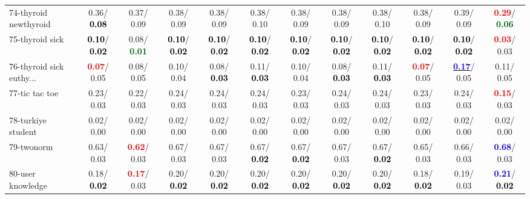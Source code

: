 \begin{table}[h]
\begin{center}
{\begin{tabular}{lc|c|c|c|c|c|c|c|c|c|c}
74-thyroid newthyroid &   0.36/\textcolor{black}{\textbf{  0.08}} &   0.37/  0.09 &   0.38/  0.09 &   0.38/  0.09 &   0.38/  0.10 &   0.38/  0.09 &   0.38/  0.09 &   0.38/  0.10 &   0.38/  0.09 &   0.39/  0.09 & \textcolor{red}{\textbf{  0.29}}/\textcolor{darkgreen}{\textbf{  0.06}} \\
75-thyroid sick & \textcolor{black}{\textbf{  0.10}}/\textcolor{black}{\textbf{  0.02}} &   0.08/\textcolor{darkgreen}{\textbf{  0.01}} & \textcolor{black}{\textbf{  0.10}}/\textcolor{black}{\textbf{  0.02}} & \textcolor{black}{\textbf{  0.10}}/\textcolor{black}{\textbf{  0.02}} & \textcolor{black}{\textbf{  0.10}}/\textcolor{black}{\textbf{  0.02}} & \textcolor{black}{\textbf{  0.10}}/\textcolor{black}{\textbf{  0.02}} & \textcolor{black}{\textbf{  0.10}}/\textcolor{black}{\textbf{  0.02}} & \textcolor{black}{\textbf{  0.10}}/\textcolor{black}{\textbf{  0.02}} & \textcolor{black}{\textbf{  0.10}}/\textcolor{black}{\textbf{  0.02}} & \textcolor{black}{\textbf{  0.10}}/\textcolor{black}{\textbf{  0.02}} & \textcolor{red}{\textbf{  0.03}}/  0.03 \\
76-thyroid sick euthy... & \textcolor{red}{\textbf{  0.07}}/  0.05 &   0.08/  0.05 &   0.10/  0.04 &   0.08/\textcolor{black}{\textbf{  0.03}} &   0.11/\textcolor{black}{\textbf{  0.03}} &   0.10/  0.04 &   0.08/\textcolor{black}{\textbf{  0.03}} &   0.11/\textcolor{black}{\textbf{  0.03}} & \textcolor{red}{\textbf{  0.07}}/  0.05 & \underline{\textcolor{blue}{\textbf{  0.17}}}/  0.05 &   0.11/  0.05 \\
77-tic tac toe &   0.23/  0.03 &   0.22/  0.03 &   0.24/  0.03 &   0.24/  0.03 &   0.24/  0.03 &   0.23/  0.03 &   0.24/  0.03 &   0.24/  0.03 &   0.23/  0.03 &   0.24/  0.03 & \textcolor{red}{\textbf{  0.15}}/  0.03 \\
78-turkiye student &   0.02/  0.00 &   0.02/  0.00 &   0.02/  0.00 &   0.02/  0.00 &   0.02/  0.00 &   0.02/  0.00 &   0.02/  0.00 &   0.02/  0.00 &   0.02/  0.00 &   0.02/  0.00 &   0.02/  0.00 \\ \hline
79-twonorm &   0.63/  0.03 & \textcolor{red}{\textbf{  0.62}}/  0.03 &   0.67/  0.03 &   0.67/  0.03 &   0.67/\textcolor{black}{\textbf{  0.02}} &   0.67/\textcolor{black}{\textbf{  0.02}} &   0.67/  0.03 &   0.67/\textcolor{black}{\textbf{  0.02}} &   0.65/  0.03 &   0.66/  0.03 & \textcolor{blue}{\textbf{  0.68}}/  0.03 \\
80-user knowledge &   0.18/\textcolor{black}{\textbf{  0.02}} & \textcolor{red}{\textbf{  0.17}}/  0.03 &   0.20/\textcolor{black}{\textbf{  0.02}} &   0.20/\textcolor{black}{\textbf{  0.02}} &   0.20/\textcolor{black}{\textbf{  0.02}} &   0.20/\textcolor{black}{\textbf{  0.02}} &   0.20/\textcolor{black}{\textbf{  0.02}} &   0.20/\textcolor{black}{\textbf{  0.02}} &   0.18/\textcolor{black}{\textbf{  0.02}} &   0.19/  0.03 & \textcolor{blue}{\textbf{  0.21}}/\textcolor{black}{\textbf{  0.02}} \\

\end{tabular}}
\end{center}
\end{table}
